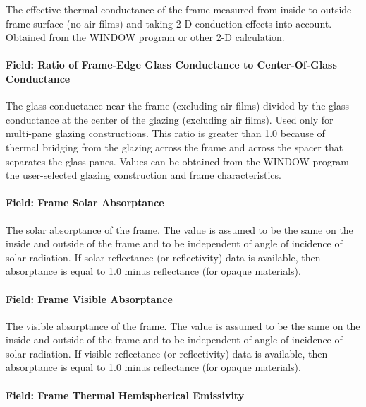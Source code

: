 The effective thermal conductance of the frame measured from inside to outside frame surface (no air films) and taking 2-D conduction effects into account. Obtained from the WINDOW program or other 2-D calculation.

\paragraph{Field: Ratio of Frame-Edge Glass Conductance to Center-Of-Glass Conductance}\label{field-ratio-of-frame-edge-glass-conductance-to-center-of-glass-conductance}

The glass conductance near the frame (excluding air films) divided by the glass conductance at the center of the glazing (excluding air films). Used only for multi-pane glazing constructions. This ratio is greater than 1.0 because of thermal bridging from the glazing across the frame and across the spacer that separates the glass panes. Values can be obtained from the WINDOW program the user-selected glazing construction and frame characteristics.

\paragraph{Field: Frame Solar Absorptance}\label{field-frame-solar-absorptance}

The solar absorptance of the frame. The value is assumed to be the same on the inside and outside of the frame and to be independent of angle of incidence of solar radiation. If solar reflectance (or reflectivity) data is available, then absorptance is equal to 1.0 minus reflectance (for opaque materials).

\paragraph{Field: Frame Visible Absorptance}\label{field-frame-visible-absorptance}

The visible absorptance of the frame. The value is assumed to be the same on the inside and outside of the frame and to be independent of angle of incidence of solar radiation. If visible reflectance (or reflectivity) data is available, then absorptance is equal to 1.0 minus reflectance (for opaque materials).

\paragraph{Field: Frame Thermal Hemispherical Emissivity}\label{field-frame-thermal-hemispherical-emissivity}

